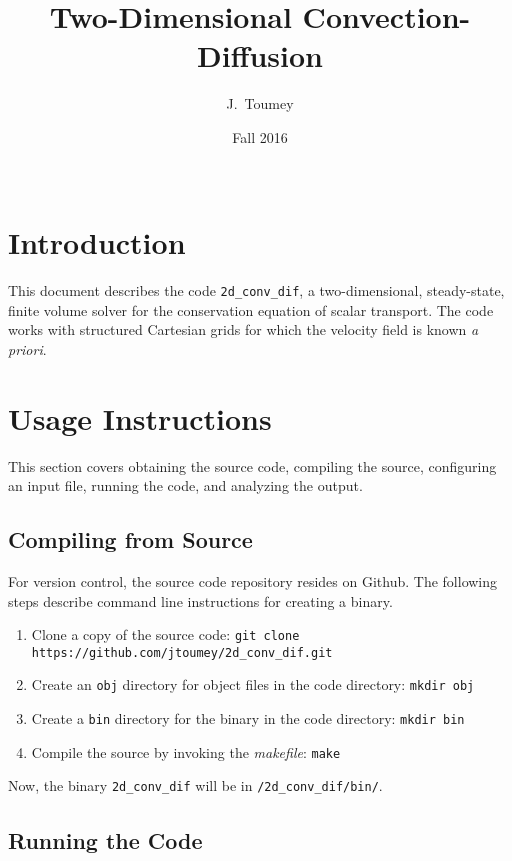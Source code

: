\documentclass{article}
\title{Two-Dimensional Convection-Diffusion}
\author{J.\ Toumey}
\date{Fall 2016 \\ \horrule{1.5pt} \\[0.05cm]}
\begin{document}
\maketitle

\thispagestyle{empty}

\tableofcontents
\newpage

\section{Introduction}
This document describes the code \texttt{2d\_conv\_dif}, a two-dimensional, steady-state, finite volume solver for the conservation equation of scalar transport.
The code works with structured Cartesian grids for which the velocity field is known \textit{a priori}.


%
%
%
\section{Usage Instructions}
This section covers obtaining the source code, compiling the source, configuring an input file, running the code, and analyzing the output.

\subsection{Compiling from Source}
For version control, the source code repository resides on Github. The following steps describe command line instructions for creating a binary.

\begin{enumerate}
   \item Clone a copy of the source code: \texttt{git clone https://github.com/jtoumey/2d\_conv\_dif.git}
   \item Create an \texttt{obj} directory for object files in the code directory: \texttt{mkdir obj}
   \item Create a \texttt{bin} directory for the binary in the code directory: \texttt{mkdir bin}
   \item Compile the source by invoking the \textit{makefile}: \texttt{make}
\end{enumerate}

Now, the binary \texttt{2d\_conv\_dif} will be in \texttt{/2d\_conv\_dif/bin/}.

\subsection{Running the Code}
\end{document}
